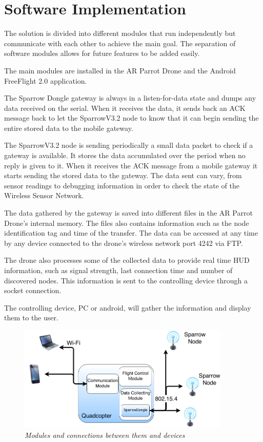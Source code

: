 \normalfont\normalsize
\chapter{Software Implementation}

The solution is divided into different modules that run independently  but communicate with each other to achieve the main goal. The separation of software modules allows for future features to be added easily.

The main modules are installed in the AR Parrot Drone and the Android FreeFlight 2.0 application.

The Sparrow Dongle gateway is always in a listen-for-data state and dumps any data received on the serial. When it receives the data, it sends back an ACK message back to let the SparrowV3.2 node to know that it can begin sending the entire stored data to the mobile gateway.

The SparrowV3.2 node is sending periodically a small data packet to check if a gateway is available. It stores the data accumulated over the period when no reply is given to it. When it receives the ACK message from a mobile gateway it starts sending the stored data to the gateway. The data sent can vary, from sensor readings to debugging information in order to check the state of the Wireless Sensor Network.

The data gathered by the gateway is saved into different files in the AR Parrot Drone's internal memory. The files also contains information such as the node identification tag and time of the transfer. The data can be accessed at any time by any device connected to the drone's wireless network port 4242 via FTP.

The drone also processes some of the collected data to provide real time HUD information, such as signal strength, last connection time and number of discovered nodes. This information is sent to the controlling device through a socket connection.

The controlling device, PC or android, will gather the information and display them to the user.

\clearpage

\begin{figure}[ht]
\begin{center}
\includegraphics[width=0.9\textwidth]{img/organigrama.png}
\end{center}
\caption{\small \itshape{Modules and connections between them and devices}}
\end{figure}

